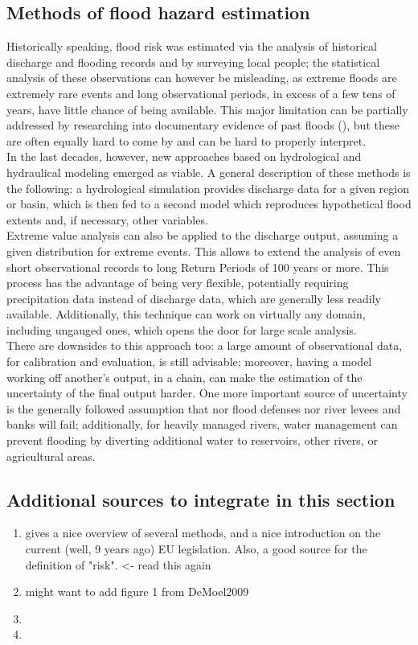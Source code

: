 \subsection{Methods of flood hazard estimation}
Historically speaking, flood risk was estimated via the analysis of historical discharge and flooding records and by surveying local people; the statistical analysis of these observations can however be misleading, as extreme floods are extremely rare events and long observational periods, in excess of a few tens of years, have little chance of being available. This major limitation can be partially addressed by researching into documentary evidence of past floods (\cite{Kjeldsen2014}), but these are often equally hard to come by and can be hard to properly interpret.\\

In the last decades, however, new approaches based on hydrological and hydraulical modeling emerged as viable. A general description of these methods is the following: a hydrological simulation provides discharge data for a given region or basin, which is then fed to a second model which reproduces hypothetical flood extents and, if necessary, other variables.\\
Extreme value analysis can also be applied to the discharge output, assuming a given distribution for extreme events. This allows to extend the analysis of even short observational records to long Return Periods of 100 years or more. This process has the advantage of being very flexible, potentially requiring precipitation data instead of discharge data, which are generally less readily available. Additionally, this technique can work on virtually any domain, including ungauged ones, which opens the door for large scale analysis.\\

There are downsides to this approach too: a large amount of observational data, for calibration and evaluation, is still advisable; moreover, having a model working off another's output, in a chain, can make the estimation of the uncertainty of the final output harder. One more important source of uncertainty is the generally followed assumption that nor flood defenses nor river levees and banks will fail; additionally, for heavily managed rivers, water management can prevent flooding by diverting additional water to reservoirs, other rivers, or agricultural areas.

\subsection{Additional sources to integrate in this section}
\begin{enumerate}
    \item \cite{DeMoel2009} gives a nice overview of several methods, and a nice introduction on the current (well, 9 years ago) EU legislation. Also, a good source for the definition of "risk". <- read this again
    \item might want to add figure 1 from DeMoel2009
    \item
    \item
\end{enumerate}


